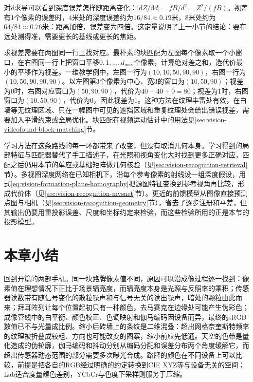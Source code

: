 对$d$求导可以看到深度误差怎样随距离变化：$\lvert\mathrm{d}Z/\mathrm{d}d\rvert=fB/d^2=Z^2/(fB)$。视差有1个像素的误差时，4米处的深度误差约为$16/84\approx0.19$米，8米处约为$64/84\approx0.76$米：距离加倍，误差变为四倍。这定量说明了上一小节的结论：要在远处测得准，需要更长的基线或更长的焦距。

求视差需要在两图同一行上找对应。最朴素的块匹配为左图每个像素取一个小窗口，在右图同一行上把窗口平移$0,1,\ldots,d_{\max}$个像素，计算绝对差之和，选代价最小的平移作为视差。一维教学例中，左图一行为$(10,10,50,90,90)$，右图一行为$(10,50,90,90,90)$。以左图第3个像素为中心、宽3的窗口为$(10,50,90)$；视差为0时，右图对应窗口为$(50,90,90)$，代价为$40+40+0=80$；视差为1时，右图窗口为$(10,50,90)$，代价为0，因此视差为1。这种方法在纹理丰富处有效，在白墙等无纹理区域、只在一幅图中可见的遮挡区域和重复纹理处会给出错误视差，需要加入平滑约束或全局优化。块匹配在视频运动估计中的用法见\ref{sec:vision-videofound-block-matching}节。

学习方法在这条路线的每一环都带来了改变，但没有取消几何本身。学习得到的局部特征与匹配器替代了手工描述子，在光照和视角变化大时找到更多正确对应，匹配之后仍用本节的单应或基础矩阵做几何核验（见\ref{sec:vision-recognition-retrieval}节）。多视图深度网络在已知相机下，沿每个参考像素的射线设一组深度假设，用式\eqref{eq:vision-formation-plane-homography}把源图特征变换到参考视角再比较，形成代价体（见\ref{sec:vision-recognition-mvsnet}节）。更近的前馈模型从图像直接预测点图与相机（见\ref{sec:vision-recognition-geometry}节），省去了逐步注册和平差，但其输出仍要用重投影误差、尺度和坐标约定来检验，而这些检验所用的正是本节的投影模型。

\section{本章小结}
\label{sec:vision-formation-summary}

回到开篇的两部手机。同一块路牌像素值不同，原因可以沿成像过程逐一找到：像素值在理想情况下正比于场景辐亮度，而辐亮度本身是光照与反照率的乘积；传感器读数带有随信号变化的散粒噪声和与信号无关的读出噪声，暗处的颗粒由此而来；拜耳阵列让每个位置起初只有一种颜色，去马赛克在边缘处可能产生伪彩色；成像管线中的白平衡、颜色校正、色调映射和伽马编码因设备而异，最终的sRGB数值已不与光量成比例。缩小后砖墙上的条纹是二维混叠：超出网格奈奎斯特频率的纹理被折叠成较粗、方向也可能改变的图案，缩小前应先低通。天空的色带是量化造成的伪轮廓，伽马编码和抖动分别从编码分配和误差分布两个角度缓解它，而超出传感器动态范围的部分需要多次曝光合成。路牌的颜色在不同设备上可以比较，前提是把各自的RGB经过明确的约定转换到CIE XYZ等与设备无关的空间；Lab适合度量颜色差别，YCbCr与色度下采样则服务于压缩。

